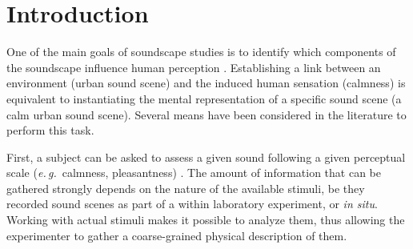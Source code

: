 \documentclass[12pt]{elsarticle}
\newcommand{\eg}{\emph{e.\,g.}}
\begin{document}
\setlength{\parindent}{5ex}

\section{Introduction}
\label{sec:intro}


One of the main goals of soundscape studies is to identify which components of the soundscape influence human perception \cite{aletta2016soundscape}. Establishing a link between an environment (urban sound scene) and the induced human sensation (calmness) is equivalent to instantiating the mental representation of a specific sound scene (a calm urban sound scene). Several means have been considered in the literature to perform this task.


First, a subject can be asked to assess a given sound following a given perceptual scale (\eg~calmness, pleasantness) \cite{axelsson2005soundscape,davies2013perception,cain2013development}. The amount of information that can be gathered strongly depends on the nature of the available stimuli, be they recorded sound scenes as part of a within laboratory experiment, or \emph{in situ}. Working with actual stimuli makes it possible to analyze them, thus allowing the experimenter to gather a coarse-grained physical description of them.

\end{document}
